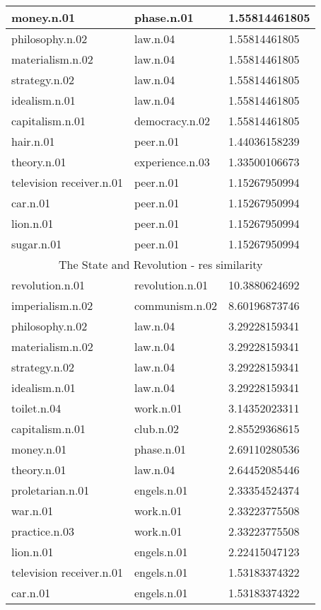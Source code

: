 \begin{center}
\begin{tabular}{ | l | l | l |}
money.n.01 & phase.n.01 & 1.55814461805\\ \hline
philosophy.n.02 & law.n.04 & 1.55814461805\\ \hline
materialism.n.02 & law.n.04 & 1.55814461805\\ \hline
strategy.n.02 & law.n.04 & 1.55814461805\\ \hline
idealism.n.01 & law.n.04 & 1.55814461805\\ \hline
capitalism.n.01 & democracy.n.02 & 1.55814461805\\ \hline
hair.n.01 & peer.n.01 & 1.44036158239\\ \hline
theory.n.01 & experience.n.03 & 1.33500106673\\ \hline
television receiver.n.01 & peer.n.01 & 1.15267950994\\ \hline
car.n.01 & peer.n.01 & 1.15267950994\\ \hline
lion.n.01 & peer.n.01 & 1.15267950994\\ \hline
sugar.n.01 & peer.n.01 & 1.15267950994\\ \hline
\multicolumn{3}{|c|}{The State and Revolution - res similarity} \\ \hline
revolution.n.01 & revolution.n.01 & 10.3880624692\\ \hline
imperialism.n.02 & communism.n.02 & 8.60196873746\\ \hline
philosophy.n.02 & law.n.04 & 3.29228159341\\ \hline
materialism.n.02 & law.n.04 & 3.29228159341\\ \hline
strategy.n.02 & law.n.04 & 3.29228159341\\ \hline
idealism.n.01 & law.n.04 & 3.29228159341\\ \hline
toilet.n.04 & work.n.01 & 3.14352023311\\ \hline
capitalism.n.01 & club.n.02 & 2.85529368615\\ \hline
money.n.01 & phase.n.01 & 2.69110280536\\ \hline
theory.n.01 & law.n.04 & 2.64452085446\\ \hline
proletarian.n.01 & engels.n.01 & 2.33354524374\\ \hline
war.n.01 & work.n.01 & 2.33223775508\\ \hline
practice.n.03 & work.n.01 & 2.33223775508\\ \hline
lion.n.01 & engels.n.01 & 2.22415047123\\ \hline
television receiver.n.01 & engels.n.01 & 1.53183374322\\ \hline
car.n.01 & engels.n.01 & 1.53183374322\\ \hline

\end{tabular}
\end{center}
